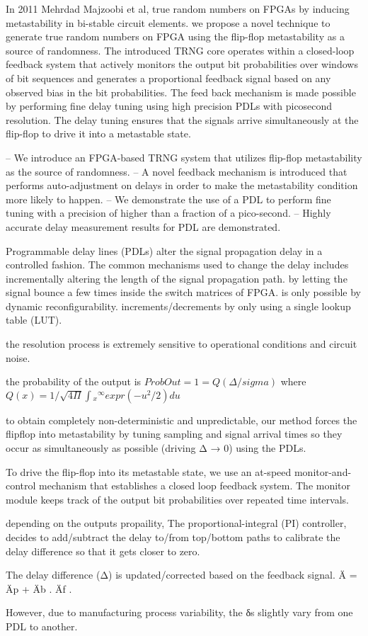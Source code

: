 In 2011 Mehrdad Majzoobi et al, 
true random numbers on FPGAs by inducing metastability in bi-stable circuit elements. we propose a novel technique to generate true random numbers on FPGA using the flip-flop metastability as a source of randomness. The introduced TRNG core operates within a closed-loop feedback system that actively monitors the output bit probabilities over windows of bit sequences and generates a proportional feedback signal based on any observed bias in the bit probabilities. The feed back mechanism is made possible by performing fine delay tuning using high precision PDLs with picosecond resolution. The delay tuning ensures that the signals arrive simultaneously at the flip-flop to drive it into a metastable state.

– We introduce an FPGA-based TRNG system that utilizes flip-flop metastability as
the source of randomness.
– A novel feedback mechanism is introduced that performs auto-adjustment on delays
in order to make the metastability condition more likely to happen.
– We demonstrate the use of a PDL to perform fine tuning with a precision of higher
than a fraction of a pico-second.
– Highly accurate delay measurement results for PDL are demonstrated.

Programmable delay lines (PDLs) alter the signal propagation delay in a controlled fashion. The common mechanisms used to change the delay includes incrementally altering the length of the signal propagation path. by letting the signal bounce a few times inside the switch matrices of FPGA. is only possible by dynamic reconfigurability. increments/decrements by only using a single lookup table (LUT).

the resolution process is extremely sensitive to operational conditions and circuit noise.

the probability of the output is $Prob{Out = 1} = Q(\Delta/sigma)$ where $Q(x)= {1/\surd{4\Pi}}{\int{_{x}{^{\infty}}} expr{(-u^{2}/2)du}}$

to obtain completely non-deterministic and unpredictable, our method forces the flipflop into metastability by tuning sampling and signal arrival times so they occur as simultaneously as possible (driving Δ → 0) using the PDLs.

To drive the flip-flop into its metastable state, we use an at-speed monitor-and-control mechanism that establishes a closed loop feedback system. The monitor module keeps track of the output bit probabilities over repeated time intervals.

depending on the outputs propaility, The proportional-integral (PI) controller, decides to add/subtract the delay to/from top/bottom paths to calibrate the delay difference so that it gets closer to zero. 

The delay difference (Δ) is updated/corrected based on the feedback signal.
Ä = Äp + Äb . Äf .

However, due to manufacturing process variability, the δs slightly vary from one PDL to another. 